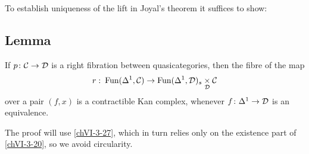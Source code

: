         To establish uniqueness of the lift in Joyal's theorem it suffices to show:

    \subsection{Lemma}\label{chVI-3-46}
        If $p \colon \mathcal{C} \to \mathcal{D}$ is a right fibration between quasicategories, then the fibre of the map
        \begin{equation*}
            r \,\colon \operatorname{Fun}(\Delta^1, \mathcal{C}) \to \operatorname{Fun}(\Delta^1, \mathcal{D})_s \underset{\mathcal{D}}{\times} \mathcal{C}
        \end{equation*}
        over a pair $(f, x)$ is a contractible Kan complex, whenever $f \colon \Delta^1 \to \mathcal{D}$ is an equivalence.
        \medskip

        The proof will use \ref{chVI-3-27}, which in turn relies only on the existence part of \ref{chVI-3-20}, so we avoid circularity.
        \smallskip

